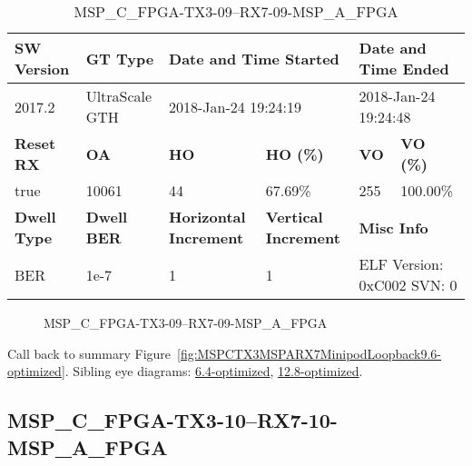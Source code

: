 \begin{table}[h]
\centering
\caption{MSP\_C\_FPGA-TX3-09--RX7-09-MSP\_A\_FPGA}
\label{tab:MSPCFPGATX309RX709MSPAFPGA9.6-optimized}
\begin{tabular}{@{}|l|l|l|l|l|l|@{}}
\toprule
\textbf{SW Version}                & \textbf{GT Type}   & \multicolumn{2}{l|}{\textbf{Date and Time Started}}            & \multicolumn{2}{l|}{\textbf{Date and Time Ended}}        \\ \midrule
2017.2                       & UltraScale GTH          & \multicolumn{2}{l|}{2018-Jan-24 19:24:19}                   & \multicolumn{2}{l|}{2018-Jan-24 19:24:48}               \\ \midrule
\textbf{Reset RX}                  & \textbf{OA} & \textbf{HO}   & \textbf{HO (\%)} & \textbf{VO} & \textbf{VO (\%)} \\ \midrule
true & 10061        & 44          & 67.69\%        & 255        & 100.00\%       \\ \midrule
\textbf{Dwell Type}                & \textbf{Dwell BER} & \textbf{Horizontal Increment} & \textbf{Vertical Increment}    & \multicolumn{2}{l|}{\textbf{Misc Info}}                  \\ \midrule
BER                            & 1e-7        & 1        & 1           & \multicolumn{2}{l|}{ELF Version: 0xC002 SVN: 0}                         \\ \bottomrule
\end{tabular}
\end{table}

\begin{figure}[h]
\caption{MSP\_C\_FPGA-TX3-09--RX7-09-MSP\_A\_FPGA} \label{fig:MSPCFPGATX309RX709MSPAFPGA9.6-optimized}
\end{figure}

Call back to summary Figure~\ref{fig:MSPCTX3MSPARX7MinipodLoopback9.6-optimized}.
Sibling eye diagrams: \hyperref[sec:MSPCFPGATX309RX709MSPAFPGA6.4-optimized]{6.4-optimized}, \hyperref[sec:MSPCFPGATX309RX709MSPAFPGA12.8-optimized]{12.8-optimized}.

\clearpage
\newpage


\subsection{MSP\_C\_FPGA-TX3-10--RX7-10-MSP\_A\_FPGA}\label{sec:MSPCFPGATX310RX710MSPAFPGA9.6-optimized}

